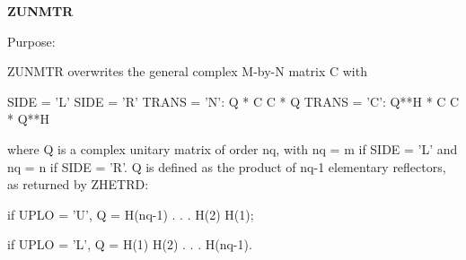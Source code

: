 {\bfseries Z\+U\+N\+M\+T\+R} 

 \begin{DoxyParagraph}{Purpose\+: }
\begin{DoxyVerb} ZUNMTR overwrites the general complex M-by-N matrix C with

                 SIDE = 'L'     SIDE = 'R'
 TRANS = 'N':      Q * C          C * Q
 TRANS = 'C':      Q**H * C       C * Q**H

 where Q is a complex unitary matrix of order nq, with nq = m if
 SIDE = 'L' and nq = n if SIDE = 'R'. Q is defined as the product of
 nq-1 elementary reflectors, as returned by ZHETRD:

 if UPLO = 'U', Q = H(nq-1) . . . H(2) H(1);

 if UPLO = 'L', Q = H(1) H(2) . . . H(nq-1).\end{DoxyVerb}
 
\end{DoxyParagraph}

